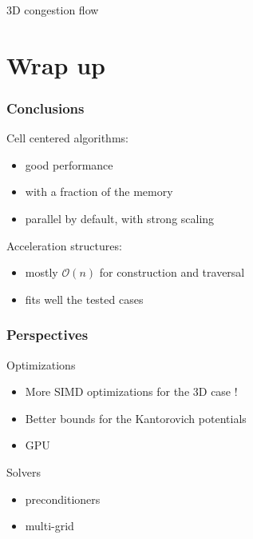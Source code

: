\documentclass[aspectratio=169]{beamer}
\begin{document}
\begin{frame}
\begin{minipage}[c][0.8\textheight][c]{0.55\textwidth}
\begin{center}
            3D congestion flow
        \end{center}
    \end{minipage}
\end{frame}

\section{Wrap up}

\begin{frame}
    \frametitle{Conclusions}

    Cell centered algorithms:
    \begin{itemize}
        \item good performance
        \item with a fraction of the memory
        \item parallel by default, with strong scaling
    \end{itemize}
    
    \vfill
    Acceleration structures:
    \begin{itemize}
        \item mostly $\mathcal{O}( n )$ for construction and traversal
        \item fits well the tested cases
    \end{itemize}
\end{frame}

\begin{frame}
    \frametitle{Perspectives}

    Optimizations
    \begin{itemize}
        \item More SIMD optimizations for the 3D case !
        \item Better bounds for the Kantorovich potentials
        \item GPU
    \end{itemize}

    \vfill
    Solvers
    \begin{itemize}
        \item preconditioners
        \item multi-grid
    \end{itemize}
\end{frame}
\end{document}
